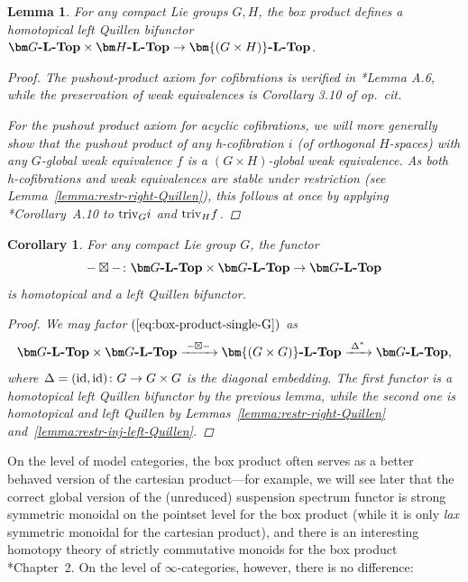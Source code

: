 \documentclass[reqno]{memo-l}
\theoremstyle{mythm}
\newtheorem{lemma}[thm]{Lemma}
\newtheorem{cor}[thm]{Corollary}
\theoremstyle{definition}
\numberwithin{equation}{section}
\newcommand{\cat}[1]{\textbf{\textup{#1}}}
\newcommand{\triv}{{\textup{triv}}}
\newcommand{\id}{\textup{id}}
\begin{document}
\begin{lemma}\label{lemma:box-product-bifun-general}
    For any compact Lie groups $G,H$, the box product defines a homotopical left Quillen bifunctor $\cat{$\bm G$-$\cat{L}$-Top}\times\cat{$\bm H$-$\cat{L}$-Top}\to\cat{$\bm{(G\times H)}$-$\cat{L}$-Top}$.
    \begin{proof}
        The pushout-product axiom for cofibrations is verified in \cite{barrero2021}*{Lemma A.6}, while the preservation of weak equivalences is Corollary 3.10 of \emph{op.\ cit.}

        For the pushout product axiom for acyclic cofibrations, we will more generally show that the pushout product of any h-cofibration $i$ (of orthogonal $H$-spaces) with any $G$-global weak equivalence $f$ is a $(G\times H)$-global weak equivalence. As both h-cofibrations and weak equivalences are stable under restriction (see Lemma~\ref{lemma:restr-right-Quillen}), this follows at once by applying \cite{barrero2021}*{Corollary~A.10} to $\triv_Gi$ and $\triv_Hf$.
    \end{proof}
\end{lemma}

\begin{cor}\label{cor:box-product-bifun}
    For any compact Lie group $G$, the functor
    \begin{equation}\label{eq:box-product-single-G}
        {-}\boxtimes{-}\colon\cat{$\bm G$-$\cat{L}$-Top}\times\cat{$\bm G$-$\cat{L}$-Top}\to\cat{$\bm G$-$\cat{L}$-Top}
    \end{equation}
    is homotopical and a left Quillen bifunctor.
    \begin{proof}
        We may factor $(\ref{eq:box-product-single-G})$ as
        \[
            \cat{$\bm G$-$\cat{L}$-Top}\times\cat{$\bm G$-$\cat{L}$-Top}\xrightarrow{\;{-}\boxtimes{-}\;}\cat{$\bm{(G\times G)}$-$\cat{L}$-Top}\xrightarrow{\;\Delta^*\;}\cat{$\bm G$-$\cat{L}$-Top},
        \]
        where $\Delta=(\id,\id)\colon G\to G\times G$ is the diagonal embedding. The first functor is a homotopical left Quillen bifunctor by the previous lemma, while the second one is homotopical and left Quillen by Lemmas~\ref{lemma:restr-right-Quillen} and~\ref{lemma:restr-inj-left-Quillen}.
    \end{proof}
\end{cor}

On the level of model categories, the box product often serves as a better behaved version of the cartesian product---for example, we will see later that the correct global version of the (unreduced) suspension spectrum functor is strong symmetric monoidal on the pointset level for the box product (while it is only \emph{lax} symmetric monoidal for the cartesian product), and there is an interesting homotopy theory of strictly commutative monoids for the box product \cite{schwede2018global}*{Chapter~2}. On the level of $\infty$-categories, however, there is no difference:
\end{document}
